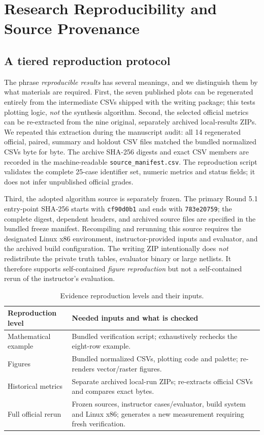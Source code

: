 \documentclass[journal,10pt]{IEEEtran}
\begin{document}
\section{Research Reproducibility and Source Provenance}

\subsection{A tiered reproduction protocol}
The phrase \emph{reproducible results} has several meanings, and we distinguish them by what materials are required. First, the seven published plots can be regenerated entirely from the intermediate CSVs shipped with the writing package; this tests plotting logic, \emph{not} the synthesis algorithm. Second, the selected official metrics can be re-extracted from the nine original, separately archived local-results ZIPs. We repeated this extraction during the manuscript audit: all 14 regenerated official, paired, summary and holdout CSV files matched the bundled normalized CSVs byte for byte. The archive SHA-256 digests and exact CSV members are recorded in the machine-readable \texttt{source\_manifest.csv}. The reproduction script validates the complete 25-case identifier set, numeric metrics and status fields; it does not infer unpublished official grades.

Third, the adopted algorithm source is separately frozen. The primary Round 5.1 entry-point SHA-256 starts with \texttt{cf90d0b1} and ends with \texttt{783e20759}; the complete digest, dependent headers, and archived source files are specified in the bundled freeze manifest. Recompiling and rerunning this source requires the designated Linux x86 environment, instructor-provided inputs and evaluator, and the archived build configuration. The writing ZIP intentionally does \emph{not} redistribute the private truth tables, evaluator binary or large netlists. It therefore supports self-contained \emph{figure reproduction} but not a self-contained rerun of the instructor's evaluation.

\begin{table}[!t]
\centering\footnotesize\setlength{\tabcolsep}{3pt}
\caption{Evidence reproduction levels and their inputs.}\label{tab:reprotier}
\begin{tabularx}{\columnwidth}{@{}p{}X@{}}\toprule
\textbf{Reproduction level} & \textbf{Needed inputs and what is checked}\\\midrule
Mathematical example & Bundled verification script; exhaustively rechecks the eight-row example.\\
Figures & Bundled normalized CSVs, plotting code and palette; re-renders vector/raster figures.\\
Historical metrics & Separate archived local-run ZIPs; re-extracts official CSVs and compares exact bytes.\\
Full official rerun & Frozen sources, instructor cases/evaluator, build system and Linux x86; generates a new measurement requiring fresh verification.\\\bottomrule
\end{tabularx}
\end{table}
\end{document}
